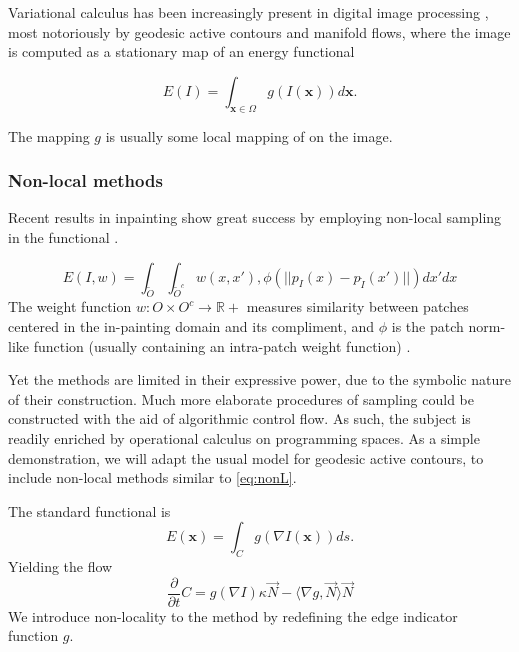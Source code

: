 \documentclass{article}
\newcommand{\RR}{\mathbb{R}}
\begin{document}
Variational calculus has been increasingly present in digital image processing \cite{imageVariational},  most notoriously by geodesic active contours \cite{Caselles1997} and manifold flows, where the image is computed as a stationary map of an energy functional

\begin{equation}
E(I)=\int_{\mathbf{x}\in\Omega}g\left(I\left(\mathbf{x}\right)\right)d\mathbf{x}.
\end{equation}

  The mapping $g$ is usually some local mapping of on the image. 
  
  \subsubsection{Non-local methods}
  
  Recent results in inpainting show great success by employing non-local sampling in the functional \cite{inpaint}. 
  
  \begin{equation}\label{eq:nonL}
  E(I,w)=\int_{\tilde{O}}\int_{\tilde{O}^c}w(x,x'),\phi\left(||p_{I}(x)-p_{\tilde{I}}(x')||\right)dx'dx
  \end{equation}
  The weight function $w:O\times O^c\to\RR+$ measures similarity between patches centered in the in-painting domain and its compliment, and $\phi$ is the patch norm-like function \cite{inpaint} (usually containing an intra-patch weight function) \cite{inpaint}.
  
  Yet the methods are limited in their expressive power, due to the symbolic nature of their construction. Much more elaborate procedures of sampling could be constructed with the aid of algorithmic control flow.  
  As such, the subject is readily enriched by operational calculus on programming spaces. As a simple demonstration, we will adapt the usual model for geodesic active contours, to include non-local methods similar to \eqref{eq:nonL}.
  
  The standard functional is
  \begin{equation}
  E(\mathbf{x})=\int_{C}g\left(\nabla I\left(\mathbf{x}\right)\right)ds.
  \end{equation}
  Yielding the flow
  \begin{equation}\label{eq:flow}
  \frac{\partial}{\partial t}C=g(\nabla I)\kappa \vec{N}-\langle\nabla g,\vec{N}\rangle\vec{N}
  \end{equation}
  We introduce non-locality to the method by redefining the edge indicator function $g$. 
  
\end{document}
